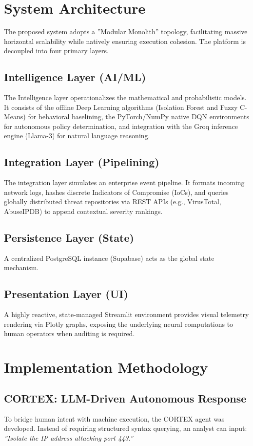 \documentclass[conference]{IEEEtran}
\begin{document}
\section{System Architecture}
The proposed system adopts a ''Modular Monolith'' topology, facilitating massive horizontal scalability while natively ensuring execution cohesion. The platform is decoupled into four primary layers.

\subsection{Intelligence Layer (AI/ML)}
The Intelligence layer operationalizes the mathematical and probabilistic models. It consists of the offline Deep Learning algorithms (Isolation Forest and Fuzzy C-Means) for behavioral baselining, the PyTorch/NumPy native DQN environments for autonomous policy determination, and integration with the Groq inference engine (Llama-3) for natural language reasoning.

\subsection{Integration Layer (Pipelining)}
The integration layer simulates an enterprise event pipeline. It formats incoming network logs, hashes discrete Indicators of Compromise (IoCs), and queries globally distributed threat repositories via REST APIs (e.g., VirusTotal, AbuseIPDB) to append contextual severity rankings.

\subsection{Persistence Layer (State)}
A centralized PostgreSQL instance (Supabase) acts as the global state mechanism. 

\subsection{Presentation Layer (UI)}
A highly reactive, state-managed Streamlit environment provides visual telemetry rendering via Plotly graphs, exposing the underlying neural computations to human operators when auditing is required.

\section{Implementation Methodology}

\subsection{CORTEX: LLM-Driven Autonomous Response}
To bridge human intent with machine execution, the CORTEX agent was developed. Instead of requiring structured syntax querying, an analyst can input: \textit{''Isolate the IP address attacking port 443.''} 
\end{document}
